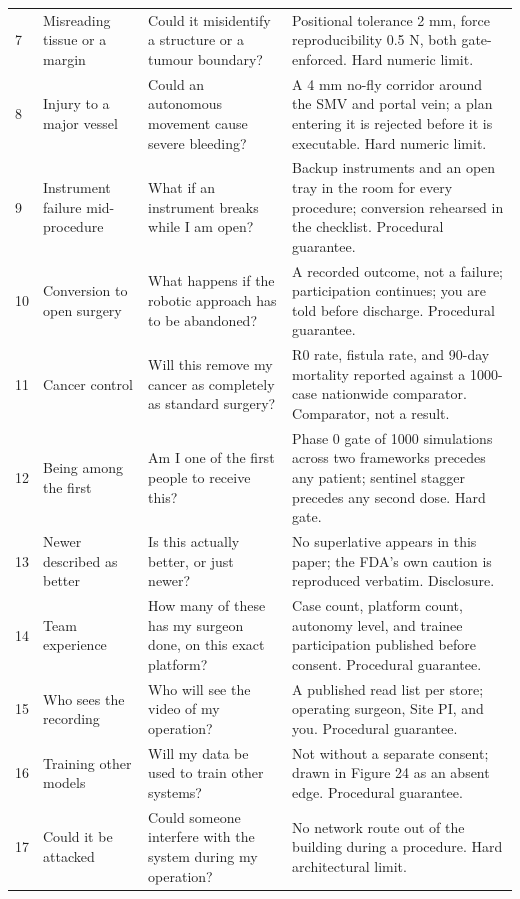 \begin{xltabular}{\textwidth}{C{0.7cm} L{3.4cm} L{4.2cm} Y}
7 & Misreading tissue or a margin & Could it misidentify a structure or a tumour boundary? & Positional tolerance 2 mm, force reproducibility 0.5 N, both gate-enforced. Hard numeric limit. \\
8 & Injury to a major vessel & Could an autonomous movement cause severe bleeding? & A 4 mm no-fly corridor around the SMV and portal vein; a plan entering it is rejected before it is executable. Hard numeric limit. \\
9 & Instrument failure mid-procedure & What if an instrument breaks while I am open? & Backup instruments and an open tray in the room for every procedure; conversion rehearsed in the checklist. Procedural guarantee. \\
10 & Conversion to open surgery & What happens if the robotic approach has to be abandoned? & A recorded outcome, not a failure; participation continues; you are told before discharge. Procedural guarantee. \\
11 & Cancer control & Will this remove my cancer as completely as standard surgery? & R0 rate, fistula rate, and 90-day mortality reported against a 1000-case nationwide comparator. Comparator, not a result. \\
12 & Being among the first & Am I one of the first people to receive this? & Phase 0 gate of 1000 simulations across two frameworks precedes any patient; sentinel stagger precedes any second dose. Hard gate. \\
13 & Newer described as better & Is this actually better, or just newer? & No superlative appears in this paper; the FDA's own caution is reproduced verbatim. Disclosure. \\
14 & Team experience & How many of these has my surgeon done, on this exact platform? & Case count, platform count, autonomy level, and trainee participation published before consent. Procedural guarantee. \\
15 & Who sees the recording & Who will see the video of my operation? & A published read list per store; operating surgeon, Site PI, and you. Procedural guarantee. \\
16 & Training other models & Will my data be used to train other systems? & Not without a separate consent; drawn in Figure 24 as an absent edge. Procedural guarantee. \\
17 & Could it be attacked & Could someone interfere with the system during my operation? & No network route out of the building during a procedure. Hard architectural limit. \\

\end{xltabular}
